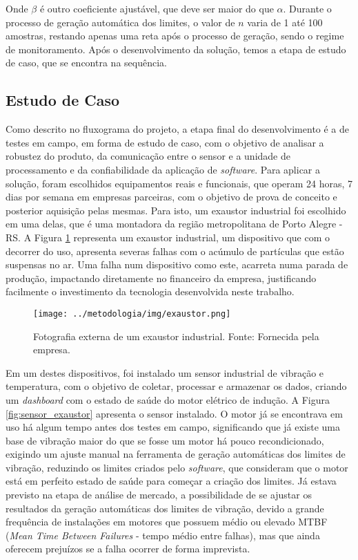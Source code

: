 \documentclass[a4paper]{ifacconf}
\begin{document}
Onde $\beta$ é outro coeficiente ajustável, que deve ser maior do que $\alpha$. Durante o processo de geração automática dos limites, o valor de
$n$ varia de 1 até 100 amostras, restando apenas uma reta após o processo de geração, sendo o regime de monitoramento. Após o desenvolvimento
da solução, temos a etapa de estudo de caso, que se encontra na sequência.


\subsection{Estudo de Caso}

Como descrito no fluxograma do projeto, a etapa final do desenvolvimento é a de testes em campo, em forma de estudo de caso, com o objetivo 
de analisar a robustez do produto, da comunicação entre o sensor e a unidade de processamento e da confiabilidade da aplicação de \textit{software}. 
Para aplicar a solução, foram escolhidos equipamentos reais e funcionais, que operam 24 horas, 7 dias por semana em empresas parceiras,
com o objetivo de prova de conceito e posterior aquisição pelas mesmas. Para isto, um exaustor industrial foi escolhido em uma delas, que é 
uma montadora da região metropolitana de Porto Alegre - RS. A Figura \ref{fig:exautor} representa um exaustor industrial, um dispositivo que com
o decorrer do uso, apresenta severas falhas com o acúmulo de partículas que estão suspensas no ar. 
Uma falha num dispositivo como este, acarreta numa parada de  produção, impactando diretamente no financeiro da empresa, justificando 
facilmente o investimento da tecnologia desenvolvida neste trabalho.

\begin{figure}[h!]
  \begin{center}
      \texttt{[image: ../metodologia/img/exaustor.png]}
  \end{center}
  \caption{Fotografia externa de um exaustor industrial. Fonte: Fornecida pela empresa.}
  \label{fig:exautor}
\end{figure}

Em um destes dispositivos, foi instalado um sensor industrial de vibração e temperatura, com o objetivo de coletar, processar e armazenar os
dados, criando um \textit{dashboard} com o estado de saúde do motor elétrico de indução. A Figura \ref{fig:sensor_exaustor} apresenta o sensor instalado.
O motor já se encontrava em uso há algum tempo antes dos testes em campo, significando que já existe uma base de vibração maior do que se fosse
um motor há pouco recondicionado, exigindo um ajuste manual na ferramenta de geração automáticas dos limites de vibração, reduzindo os limites 
criados pelo \textit{software}, que consideram que o motor está em perfeito estado de saúde para começar a criação dos limites. 
Já estava previsto na etapa de análise de mercado, a possibilidade de se ajustar os resultados da geração automáticas dos limites de vibração, 
devido a grande frequência de instalações em motores que possuem médio ou elevado MTBF (\textit{Mean Time Between Failures} - tempo médio 
entre falhas), mas que ainda oferecem prejuízos se a falha ocorrer de forma imprevista.
\end{document}
